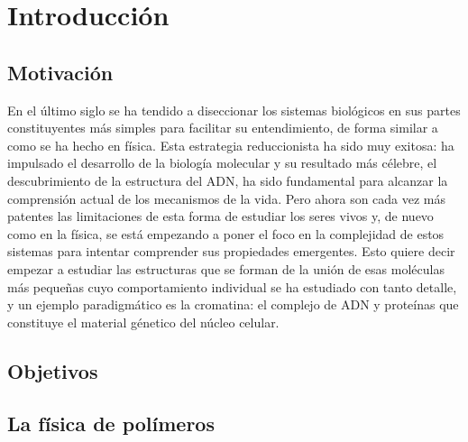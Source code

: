 \chapter{Introducción}
\label{cap:introduction}

\section{Motivación}

En el último siglo se ha tendido a diseccionar los sistemas biológicos en sus partes constituyentes más simples para facilitar su entendimiento, de forma similar a como se ha hecho en física. Esta estrategia reduccionista ha sido muy exitosa: ha impulsado el desarrollo de la biología molecular y su resultado más célebre, el descubrimiento de la estructura del ADN, ha sido fundamental para alcanzar la comprensión actual de los mecanismos de la vida. Pero ahora son cada vez más patentes las limitaciones de esta forma de estudiar los seres vivos y, de nuevo como en la física, se está empezando a poner el foco en la complejidad de estos sistemas para intentar comprender sus propiedades emergentes. Esto quiere decir empezar a estudiar las estructuras que se forman de la unión de esas moléculas más pequeñas cuyo comportamiento individual se ha estudiado con tanto detalle, y un ejemplo paradigmático es la cromatina: el complejo de ADN y proteínas que constituye el material génetico del núcleo celular.

\section{Objetivos}

\section{La física de polímeros}


